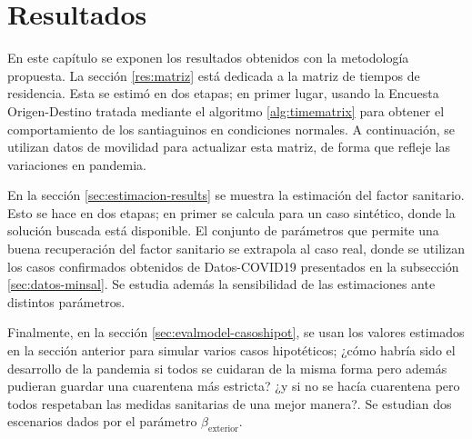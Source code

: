 \chapter{Resultados} \label{chap:results}


En este capítulo se exponen los resultados obtenidos con la metodología propuesta. La sección \ref{res:matriz} está dedicada a la matriz de tiempos de residencia. Esta se estimó en dos etapas; en primer lugar, usando la Encuesta Origen-Destino tratada mediante el algoritmo \ref{alg:timematrix} para obtener el comportamiento de los santiaguinos en condiciones normales. A continuación, se utilizan datos de movilidad para actualizar esta matriz, de forma que refleje las variaciones en pandemia.

En la sección \ref{sec:estimacion-results} se muestra la estimación del factor sanitario. Esto se hace en dos etapas; en primer se calcula para un caso sintético, donde la solución buscada está disponible. El conjunto de parámetros que permite una buena recuperación del factor sanitario se extrapola al caso real, donde se utilizan los casos confirmados obtenidos de Datos-COVID19 presentados en la subsección \ref{sec:datos-minsal}. Se estudia además la sensibilidad de las estimaciones ante distintos parámetros.

Finalmente, en la sección \ref{sec:evalmodel-casoshipot}, se usan los valores estimados en la sección anterior para simular varios casos hipotéticos; ¿cómo habría sido el desarrollo de la pandemia si todos se cuidaran de la misma forma pero además pudieran guardar una cuarentena más estricta? ¿y si no se hacía cuarentena pero todos respetaban las medidas sanitarias de una mejor manera?.  Se estudian dos escenarios dados por el parámetro \(\beta_{\text{exterior}}\).











